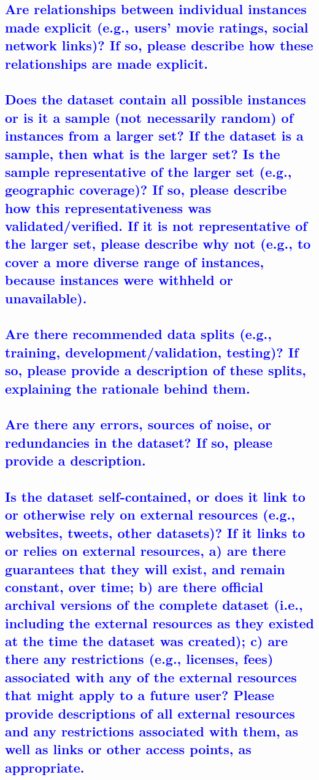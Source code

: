 \documentclass[letterpaper, 10 pt, conference]{ieeeconf}  %
\begin{document}
\textcolor{blue}{\subsection{Are relationships between individual instances made explicit (e.g.,
users’ movie ratings, social network links)? If so, please describe
how these relationships are made explicit.}}
\lipsum[1]

\textcolor{blue}{\subsection{Does the dataset contain all possible instances or is it a sample (not
necessarily random) of instances from a larger set? If the dataset is
a sample, then what is the larger set? Is the sample representative of the
larger set (e.g., geographic coverage)? If so, please describe how this
representativeness was validated/verified. If it is not representative of the
larger set, please describe why not (e.g., to cover a more diverse range of
instances, because instances were withheld or unavailable).}}
\lipsum[1]

\textcolor{blue}{\subsection{Are there recommended data splits (e.g., training, development/validation, testing)? If so, please provide a description of these
splits, explaining the rationale behind them.}}
\lipsum[1]

\textcolor{blue}{\subsection{Are there any errors, sources of noise, or redundancies in the
dataset? If so, please provide a description.}}
\lipsum[1]

\textcolor{blue}{\subsection{Is the dataset self-contained, or does it link to or otherwise rely on
external resources (e.g., websites, tweets, other datasets)? If it links
to or relies on external resources, a) are there guarantees that they will
exist, and remain constant, over time; b) are there official archival versions
of the complete dataset (i.e., including the external resources as they existed at the time the dataset was created); c) are there any restrictions
(e.g., licenses, fees) associated with any of the external resources that
might apply to a future user? Please provide descriptions of all external
resources and any restrictions associated with them, as well as links or
other access points, as appropriate.}}
\lipsum[1]
\end{document}
